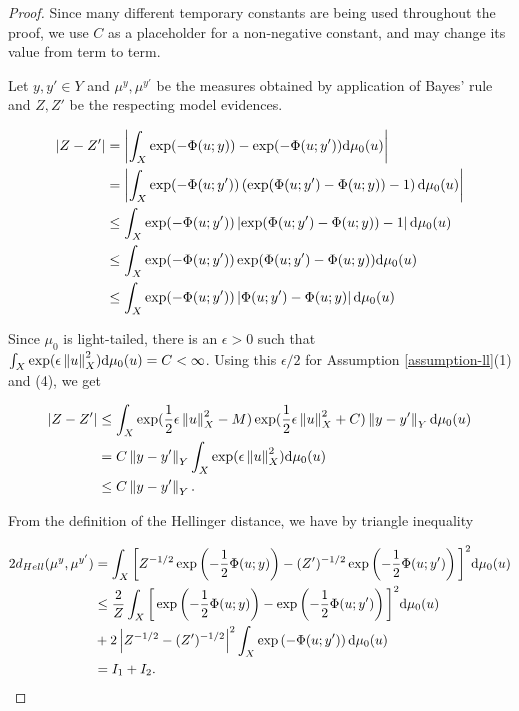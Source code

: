\begin{proof}
  Since many different temporary constants are being used throughout the proof, we use $C$ as a placeholder for a non-negative constant, and may change its value from term to term.

  Let $y, y' \in Y$ and  $\mu^y, \mu^{y'}$ be the measures obtained by application of Bayes' rule and $Z, Z'$ be the respecting model evidences.

  \begin{equation*}
    \begin{aligned}
      |Z - Z'|
      &= \left|\int_X \exp(-\Phi(u; y)) - \exp(-\Phi(u; y'))  \text{d} \mu_0(u)\right|\\
      &= \left|\int_X \exp(-\Phi(u; y'))\left(\exp(\Phi(u; y')-\Phi(u; y)) - 1\right)  \text{d} \mu_0(u)\right|\\
      &\le \int_X \exp(-\Phi(u; y'))\left|\exp(\Phi(u; y')-\Phi(u; y)) - 1\right| \text{d} \mu_0(u)\\
      &\le \int_X \exp(-\Phi(u; y'))\exp(\Phi(u; y')-\Phi(u; y)) \text{d} \mu_0(u)\\
      &\le \int_X \exp(-\Phi(u; y'))\left|\Phi(u; y')-\Phi(u; y)\right| \text{d} \mu_0(u)
    \end{aligned}
  \end{equation*}

  Since $\mu_0$ is light-tailed, there is an $\epsilon > 0$ such that $\int_X\exp(\epsilon \left\lVert u\right\rVert_X^2)\text{d} \mu_0(u) = C < \infty$. Using this $\epsilon / 2$ for Assumption \ref{assumption-ll}(1) and (4), we get

  \begin{equation*}
    \begin{aligned}
      |Z - Z'|
      &\le \int_X \exp(\frac12\epsilon\left\lVert u\right\rVert_X^2 - M)\exp(\frac12\epsilon\left\lVert u\right\rVert_X^2 + C)\left\lVert y - y'\right\rVert_Y \text{d}\mu_0(u) \\
      &= C  \left\lVert y - y'\right\rVert_Y \int_X \exp(\epsilon\left\lVert u\right\rVert_X^2) \text{d}\mu_0(u)\\
      &\le C\left\lVert y - y'\right\rVert_Y.
      \end{aligned}
  \end{equation*}

  From the definition of the Hellinger distance, we have by triangle inequality

  \begin{equation*}
    \begin{aligned}
      2d_{Hell}(\mu^y, \mu^{y'}) &= \int_X\bigg[Z^{-1/2}\exp\left(-\frac12\Phi(u;y)\right) - (Z')^{-1/2}\exp\left(-\frac12\Phi(u; y')\right)\bigg]^2\text{d}\mu_0(u)\\
      &\le \frac2Z\int_X\bigg[\exp\left(-\frac12\Phi(u;y)\right) - \exp\left(-\frac12\Phi(u; y')\right)\bigg]^2\text{d}\mu_0(u)\\
      &+ 2\left|Z^{-1/2} - (Z')^{-1/2}\right|^2\int_X\exp\left(-\Phi(u; y')\right)\text{d}\mu_0(u)\\
      &= I_1 + I_2.
    \end{aligned}
  \end{equation*}
  

\end{proof}
